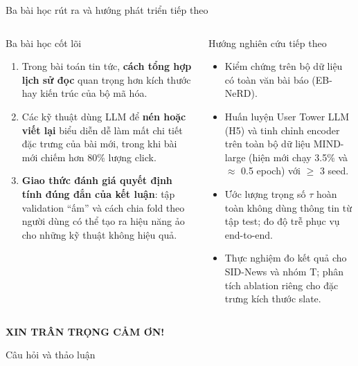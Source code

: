 \documentclass[aspectratio=169,t]{beamer}
\begin{document}
\begin{frame}[shrink]{Ba bài học rút ra và hướng phát triển tiếp theo}
\begin{columns}[T,onlytextwidth]
\begin{block}{Ba bài học cốt lõi}
\footnotesize
\begin{enumerate}
  \setlength{\itemsep}{3pt}
  \item Trong bài toán tin tức, \textbf{cách tổng hợp lịch sử đọc} quan trọng hơn kích thước hay kiến trúc của bộ mã hóa.
  \item Các kỹ thuật dùng LLM để \textbf{nén hoặc viết lại} biểu diễn dễ làm mất chi tiết đặc trưng của bài mới, trong khi bài mới chiếm hơn 80\% lượng click.
  \item \textbf{Giao thức đánh giá quyết định tính đúng đắn của kết luận}: tập validation ``ấm'' và cách chia fold theo người dùng có thể tạo ra hiệu năng ảo cho những kỹ thuật không hiệu quả.
\end{enumerate}
\end{block}
\begin{block}{Hướng nghiên cứu tiếp theo}
\footnotesize
\begin{itemize}
  \setlength{\itemsep}{3pt}
  \item Kiểm chứng trên bộ dữ liệu có toàn văn bài báo (EB-NeRD).
  \item Huấn luyện User Tower LLM (H5) và tinh chỉnh encoder trên toàn bộ dữ liệu MIND-large (hiện mới chạy 3.5\% và $\approx$ 0.5 epoch) với $\ge$ 3 seed.
  \item Ước lượng trọng số $\tau$ hoàn toàn không dùng thông tin từ tập test; đo độ trễ phục vụ end-to-end.
  \item Thực nghiệm đo kết quả cho SID-News và nhóm T; phân tích ablation riêng cho đặc trưng kích thước slate.
\end{itemize}
\end{block}
\end{columns}
\par\kern0pt%
\end{frame}

\begin{frame}[c,noframenumbering]
\centering
{\Huge\bfseries\color{accentc}XIN TRÂN TRỌNG CẢM ƠN!\par}
\vspace{0.5cm}
{\large Câu hỏi và thảo luận\par}
\par\kern0pt%
\end{frame}
\end{document}
